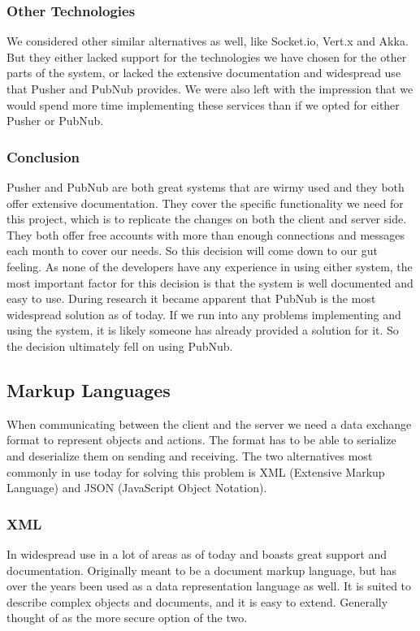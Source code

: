 \subsubsection{Other Technologies}
We considered other similar alternatives as well, like Socket.io, Vert.x and Akka. But they either lacked support for the technologies we have chosen for the other parts of the system, or lacked the extensive documentation and widespread use that Pusher and PubNub provides. We were also left with the impression that we would spend more time implementing these services than if we opted for either Pusher or PubNub.

\subsubsection{Conclusion}
Pusher and PubNub are both great systems that are wirmy used and they both offer extensive documentation. They cover the specific functionality we need for this project, which is to replicate the changes on both the client and server side. They both offer free accounts with more than enough connections and messages each month to cover our needs. So this decision will come down to our gut feeling. As none of the developers have any experience in using either system, the most important factor for this decision is that the system is well documented and easy to use. During research it became apparent that PubNub is the most widespread solution as of today. If we run into any problems implementing and using the system, it is likely someone has already provided a solution for it. So the decision ultimately fell on using PubNub.


\subsection{Markup Languages}
When communicating between the client and the server we need a data exchange format to represent objects and actions. The format has to be able to serialize and deserialize them on sending and receiving. The two alternatives most commonly in use today for solving this problem is XML (Extensive Markup Language) and JSON (JavaScript Object Notation).

\subsubsection{XML}
In widespread use in a lot of areas as of today and boasts great support and documentation. Originally meant to be a document markup language, but has over the years been used as a data representation language as well. It is suited to describe complex objects and documents, and it is easy to extend. Generally thought of as the more secure option of the two.

